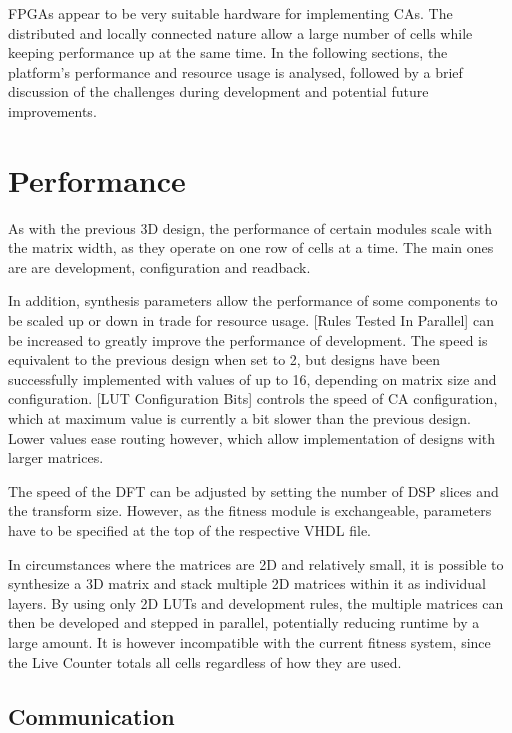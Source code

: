 FPGAs appear to be very suitable hardware for implementing CAs.
The distributed and locally connected nature allow a large number of cells while keeping performance up at the same time.
In the following sections, the platform's performance and resource usage is analysed, followed by a brief discussion of the challenges during development and potential future improvements.


\section{Performance}

As with the previous 3D design, the performance of certain modules scale with the matrix width, as they operate on one row of cells at a time.
The main ones are are development, configuration and readback.

In addition, synthesis parameters allow the performance of some components to be scaled up or down in trade for resource usage.
[Rules Tested In Parallel] can be increased to greatly improve the performance of development.
The speed is equivalent to the previous design when set to 2, but designs have been successfully implemented with values of up to 16, depending on matrix size and configuration.
[LUT Configuration Bits] controls the speed of CA configuration, which at maximum value is currently a bit slower than the previous design.
Lower values ease routing however, which allow implementation of designs with larger matrices.

The speed of the DFT can be adjusted by setting the number of DSP slices and the transform size.
However, as the fitness module is exchangeable, parameters have to be specified at the top of the respective VHDL file.

In circumstances where the matrices are 2D and relatively small, it is possible to synthesize a 3D matrix and stack multiple 2D matrices within it as individual layers.
By using only 2D LUTs and development rules, the multiple matrices can then be developed and stepped in parallel, potentially reducing runtime by a large amount.
It is however incompatible with the current fitness system, since the Live Counter totals all cells regardless of how they are used.

\subsection{Communication}

